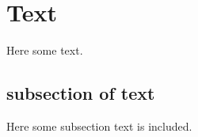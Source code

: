 \section{Text}
\label{sec:text} %

Here some text.

\subsection{subsection of text}
Here some subsection text is included.